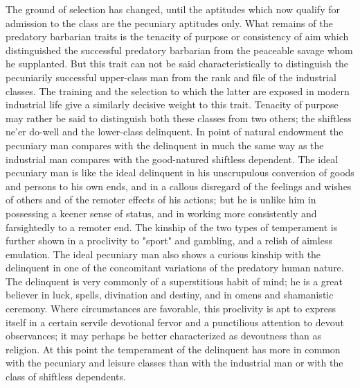 \documentclass[12pt]{report}
\begin{document}
The ground of selection has changed, until the aptitudes which now
qualify for admission to the class are the pecuniary aptitudes only.
What remains of the predatory barbarian traits is the tenacity of
purpose or consistency of aim which distinguished the successful
predatory barbarian from the peaceable savage whom he supplanted.
But this trait can not be said characteristically to distinguish the
pecuniarily successful upper-class man from the rank and file of the
industrial classes. The training and the selection to which the latter
are exposed in modern industrial life give a similarly decisive weight
to this trait. Tenacity of purpose may rather be said to distinguish
both these classes from two others; the shiftless ne'er do-well and the
lower-class delinquent. In point of natural endowment the pecuniary man
compares with the delinquent in much the same way as the industrial man
compares with the good-natured shiftless dependent. The ideal pecuniary
man is like the ideal delinquent in his unscrupulous conversion of goods
and persons to his own ends, and in a callous disregard of the feelings
and wishes of others and of the remoter effects of his actions; but he
is unlike him in possessing a keener sense of status, and in working
more consistently and farsightedly to a remoter end. The kinship of the
two types of temperament is further shown in a proclivity to "sport"
and gambling, and a relish of aimless emulation. The ideal pecuniary
man also shows a curious kinship with the delinquent in one of the
concomitant variations of the predatory human nature. The delinquent is
very commonly of a superstitious habit of mind; he is a great believer
in luck, spells, divination and destiny, and in omens and shamanistic
ceremony. Where circumstances are favorable, this proclivity is apt to
express itself in a certain servile devotional fervor and a punctilious
attention to devout observances; it may perhaps be better characterized
as devoutness than as religion. At this point the temperament of the
delinquent has more in common with the pecuniary and leisure classes
than with the industrial man or with the class of shiftless dependents.
\end{document}
